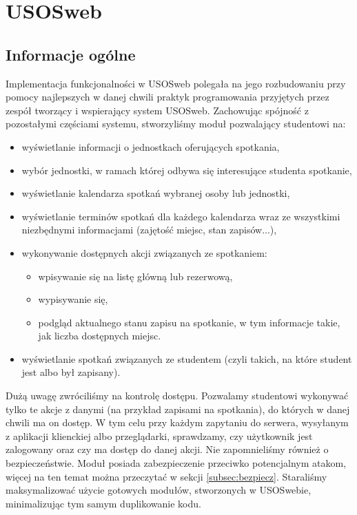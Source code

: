 \documentclass[licencjacka]{pracamgr}
\begin{document}

\section{USOSweb} \label{sec:impusosweb}

\subsection{Informacje ogólne}
Implementacja funkcjonalności w USOSweb polegała na jego rozbudowaniu przy pomocy najlepszych w danej chwili praktyk programowania przyjętych przez zespół tworzący i wspierający system USOSweb. Zachowując spójność z pozostałymi częściami systemu, stworzyliśmy moduł pozwalający studentowi na:
\begin{itemize}
  \item{wyświetlanie informacji o jednostkach oferujących spotkania,}
  \item{wybór jednostki, w ramach której odbywa się interesujące studenta spotkanie,}
  \item{wyświetlanie kalendarza spotkań wybranej osoby lub jednostki,}
  \item{wyświetlanie terminów spotkań dla każdego kalendarza wraz ze wszystkimi niezbędnymi informacjami (zajętość miejsc, stan zapisów...),}
  \item{wykonywanie dostępnych akcji związanych ze spotkaniem:
  \begin{itemize}
    \item{wpisywanie się na listę główną lub rezerwową,}
    \item{wypisywanie się,}
    \item{podgląd aktualnego stanu zapisu na spotkanie, w tym informacje takie, jak liczba dostępnych miejsc.}
  \end{itemize}
}
\item{wyświetlanie spotkań związanych ze studentem (czyli takich, na które student jest albo był zapisany).}
\end{itemize}

Dużą uwagę zwróciliśmy na kontrolę dostępu. Pozwalamy studentowi wykonywać tylko te akcje z danymi (na przykład zapisami na spotkania), do których w danej chwili ma on dostęp. W tym celu przy każdym zapytaniu do serwera, wysyłanym z aplikacji klienckiej albo przeglądarki, sprawdzamy, czy użytkownik jest zalogowany oraz czy ma dostęp do danej akcji. Nie zapomnieliśmy również o bezpieczeństwie. Moduł posiada zabezpieczenie przeciwko potencjalnym atakom, więcej na ten temat można przeczytać w sekcji \ref{subsec:bezpiecz}. Staraliśmy maksymalizować użycie gotowych modułów, stworzonych w USOSwebie, minimalizując tym samym duplikowanie kodu.
\end{document}
